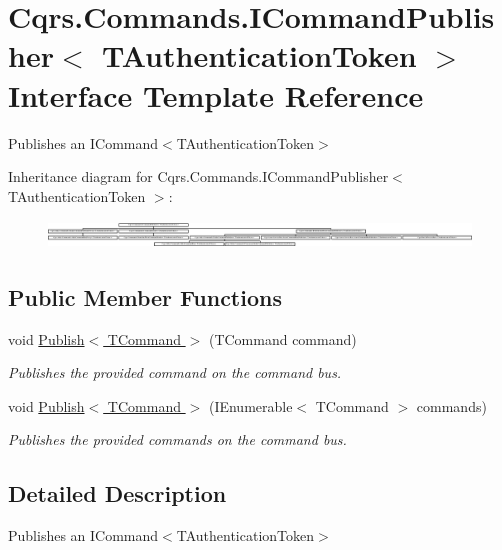 \hypertarget{interfaceCqrs_1_1Commands_1_1ICommandPublisher}{}\section{Cqrs.\+Commands.\+I\+Command\+Publisher$<$ T\+Authentication\+Token $>$ Interface Template Reference}
\label{interfaceCqrs_1_1Commands_1_1ICommandPublisher}


Publishes an I\+Command$<$\+T\+Authentication\+Token$>$  


Inheritance diagram for Cqrs.\+Commands.\+I\+Command\+Publisher$<$ T\+Authentication\+Token $>$\+:\begin{figure}[H]
\begin{center}
\leavevmode
\includegraphics[height=0.754209cm]{interfaceCqrs_1_1Commands_1_1ICommandPublisher}
\end{center}
\end{figure}
\subsection*{Public Member Functions}
\begin{DoxyCompactItemize}
\item 
void \hyperlink{interfaceCqrs_1_1Commands_1_1ICommandPublisher_aeeb487ad5686d9c44d214b1daaf7833a_aeeb487ad5686d9c44d214b1daaf7833a}{Publish$<$ T\+Command $>$} (T\+Command command)
\begin{DoxyCompactList}\small\item\em Publishes the provided {\itshape command}  on the command bus. \end{DoxyCompactList}\item 
void \hyperlink{interfaceCqrs_1_1Commands_1_1ICommandPublisher_af0f033c0b949e5650032e4f00b11b595_af0f033c0b949e5650032e4f00b11b595}{Publish$<$ T\+Command $>$} (I\+Enumerable$<$ T\+Command $>$ commands)
\begin{DoxyCompactList}\small\item\em Publishes the provided {\itshape commands}  on the command bus. \end{DoxyCompactList}\end{DoxyCompactItemize}


\subsection{Detailed Description}
Publishes an I\+Command$<$\+T\+Authentication\+Token$>$ 



